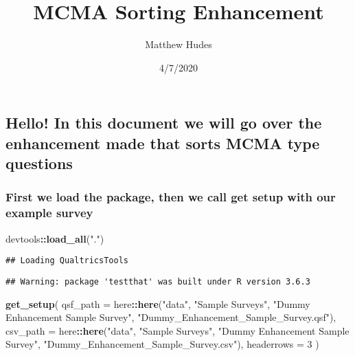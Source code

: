 \documentclass[
]{article}
\title{MCMA Sorting Enhancement}
\author{Matthew Hudes}
\date{4/7/2020}
\newenvironment{Shaded}{\begin{snugshade}}{\end{snugshade}}
\newcommand{\DataTypeTok}[1]{\textcolor[rgb]{0.13,0.29,0.53}{#1}}
\newcommand{\DecValTok}[1]{\textcolor[rgb]{0.00,0.00,0.81}{#1}}
\newcommand{\KeywordTok}[1]{\textcolor[rgb]{0.13,0.29,0.53}{\textbf{#1}}}
\newcommand{\NormalTok}[1]{#1}
\newcommand{\OperatorTok}[1]{\textcolor[rgb]{0.81,0.36,0.00}{\textbf{#1}}}
\newcommand{\StringTok}[1]{\textcolor[rgb]{0.31,0.60,0.02}{#1}}
\begin{document}
\maketitle

\hypertarget{hello-in-this-document-we-will-go-over-the-enhancement-made-that-sorts-mcma-type-questions}{%
\subsection{Hello! In this document we will go over the enhancement made
that sorts MCMA type
questions}\label{hello-in-this-document-we-will-go-over-the-enhancement-made-that-sorts-mcma-type-questions}}

\hypertarget{first-we-load-the-package-then-we-call-get-setup-with-our-example-survey}{%
\subsubsection{First we load the package, then we call get setup with
our example
survey}\label{first-we-load-the-package-then-we-call-get-setup-with-our-example-survey}}

\begin{Shaded}
\begin{Highlighting}[]
\NormalTok{devtools}\OperatorTok{::}\KeywordTok{load\_all}\NormalTok{(}\StringTok{"."}\NormalTok{)}
\end{Highlighting}
\end{Shaded}

\begin{verbatim}
## Loading QualtricsTools
\end{verbatim}

\begin{verbatim}
## Warning: package 'testthat' was built under R version 3.6.3
\end{verbatim}

\begin{Shaded}
\begin{Highlighting}[]
\KeywordTok{get\_setup}\NormalTok{(}
  \DataTypeTok{qsf\_path =}\NormalTok{ here}\OperatorTok{::}\KeywordTok{here}\NormalTok{(}\StringTok{"data"}\NormalTok{, }\StringTok{"Sample Surveys"}\NormalTok{, }\StringTok{"Dummy Enhancement Sample Survey"}\NormalTok{, }\StringTok{"Dummy\_Enhancement\_Sample\_Survey.qsf"}\NormalTok{),}
  \DataTypeTok{csv\_path =}\NormalTok{ here}\OperatorTok{::}\KeywordTok{here}\NormalTok{(}\StringTok{"data"}\NormalTok{, }\StringTok{"Sample Surveys"}\NormalTok{, }\StringTok{"Dummy Enhancement Sample Survey"}\NormalTok{, }\StringTok{"Dummy\_Enhancement\_Sample\_Survey.csv"}\NormalTok{),}
  \DataTypeTok{headerrows =} \DecValTok{3}
\NormalTok{)}
\end{Highlighting}
\end{Shaded}
\end{document}
